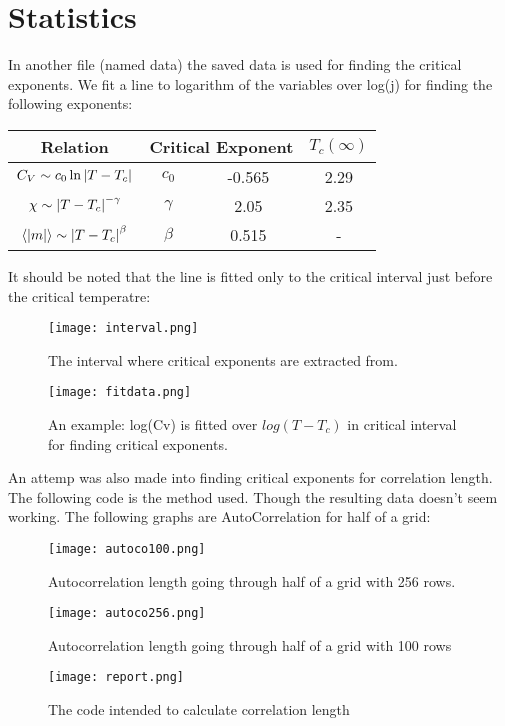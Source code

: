 \documentclass[12pt,a4paper]{article}
\begin{document}
			
\pagebreak
	\section{Statistics}		
 In another file (named data) the saved data is used for finding the critical exponents. We fit a line to logarithm of the variables over log(j) for finding the following exponents:

\begin{center}

	\begin{tabular}{|c|c|c|c|}
		\hline
	Relation & \multicolumn{2}{|c|}{Critical Exponent} & $T_c(\infty)$ \\
	\hline
	$C_V\sim c_0\ln{\abs{T-T_c}}$ & $c_0$ & -0.565 & 2.29 \\
	$\chi\sim\abs{T-T_c}^{-\gamma}$ & $\gamma$ & 2.05 & 2.35 \\
	$\expval{\abs{m}}\sim\abs{T-T_c}^{\beta}$ & $\beta$ &0.515 & - \\
	\hline
\end{tabular}
\end{center}

It should be noted that the line is fitted only to the critical interval just before the critical temperatre:

\begin{figure}[H]
	\centering
	\texttt{[image: interval.png]}
	\caption{The interval where critical exponents are extracted from. }
\end{figure}

\begin{figure}[H]
	\centering
	\texttt{[image: fitdata.png]}
	\caption{An example: log(Cv) is fitted over $log(T-T_c)$ in critical interval for finding critical exponents. }
\end{figure}

An attemp was also made into finding critical exponents for correlation length. The following code is the method used. Though the resulting data doesn't seem working. The following graphs are AutoCorrelation for half of a grid:
\begin{figure}[H]
	\centering
	\texttt{[image: autoco100.png]}
	\caption{Autocorrelation length going through half of a grid with 256 rows. }
\end{figure}
\begin{figure}[H]
	\centering
	\texttt{[image: autoco256.png]}
	\caption{Autocorrelation length going through half of a grid with 100 rows }
\end{figure}

\begin{figure}[H]
	\centering
	\texttt{[image: report.png]}
	\caption{The code intended to calculate correlation length }
\end{figure}
			
\end{document}
